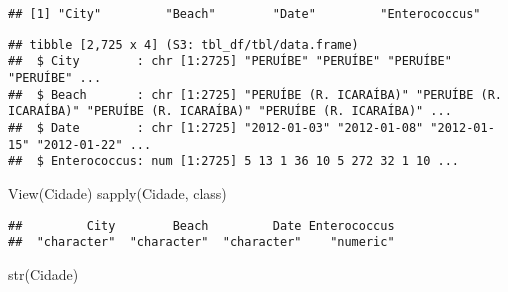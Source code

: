 \documentclass[
]{article}
\newenvironment{Shaded}{\begin{snugshade}}{\end{snugshade}}
\newcommand{\CommentTok}[1]{\textcolor[rgb]{0.56,0.35,0.01}{\textit{#1}}}
\newcommand{\DocumentationTok}[1]{\textcolor[rgb]{0.56,0.35,0.01}{\textbf{\textit{#1}}}}
\newcommand{\FunctionTok}[1]{\textcolor[rgb]{0.00,0.00,0.00}{#1}}
\newcommand{\NormalTok}[1]{#1}
\newcommand{\OtherTok}[1]{\textcolor[rgb]{0.56,0.35,0.01}{#1}}
\newcommand{\SpecialCharTok}[1]{\textcolor[rgb]{0.00,0.00,0.00}{#1}}
\newcommand{\StringTok}[1]{\textcolor[rgb]{0.31,0.60,0.02}{#1}}
\begin{document}
\begin{verbatim}
## [1] "City"         "Beach"        "Date"         "Enterococcus"
\end{verbatim}

\begin{Shaded}
\end{Shaded}

\begin{verbatim}
## tibble [2,725 x 4] (S3: tbl_df/tbl/data.frame)
##  $ City        : chr [1:2725] "PERUÍBE" "PERUÍBE" "PERUÍBE" "PERUÍBE" ...
##  $ Beach       : chr [1:2725] "PERUÍBE (R. ICARAÍBA)" "PERUÍBE (R. ICARAÍBA)" "PERUÍBE (R. ICARAÍBA)" "PERUÍBE (R. ICARAÍBA)" ...
##  $ Date        : chr [1:2725] "2012-01-03" "2012-01-08" "2012-01-15" "2012-01-22" ...
##  $ Enterococcus: num [1:2725] 5 13 1 36 10 5 272 32 1 10 ...
\end{verbatim}

\begin{Shaded}
\begin{Highlighting}[]
\FunctionTok{View}\NormalTok{(Cidade)}
\FunctionTok{sapply}\NormalTok{(Cidade, class)}
\end{Highlighting}
\end{Shaded}

\begin{verbatim}
##         City        Beach         Date Enterococcus 
##  "character"  "character"  "character"    "numeric"
\end{verbatim}

\begin{Shaded}
\begin{Highlighting}[]
\FunctionTok{str}\NormalTok{(Cidade)}
\end{Highlighting}
\end{Shaded}
\end{document}
